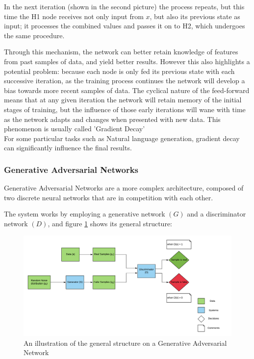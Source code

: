 In the next iteration (shown in the second picture) the process repeats, but this time the  H1 node receives not only input from $x$, but also its previous state as input; it processes the combined values and passes it on to H2, which undergoes the same procedure.

Through this mechanism, the network can better retain knowledge of features from past samples of data, and yield better results.
However this also highlights a potential problem: because each node is only fed its previous state with each successive iteration, as the training process continues the network will develop a bias towards more recent samples of data.
 The cyclical nature of the feed-forward means that at any given iteration the network will retain memory of the initial stages of training, but the influence of those early iterations will wane with time as the network adapts and changes when presented with new data. This phenomenon is usually called 'Gradient Decay'\\
For some particular tasks such as Natural language generation, gradient decay can significantly influence the final results.

\subsubsection{Generative Adversarial Networks}\label{subsubsec:gans}
Generative Adversarial Networks are a more complex architecture, composed of two discrete neural networks that are in competition with each other.

The system works by employing a generative network $(G)$ and a discriminator network $(D)$, and figure \ref{fig:gan-diagram} shows its general structure:

\begin{figure}[H]
\centering
    \includegraphics[scale=0.55]{figures/GAN_v4.png}
    \caption{An illustration of the general structure on a Generative Adversarial Network}
    \label{fig:gan-diagram}
\end{figure}    

